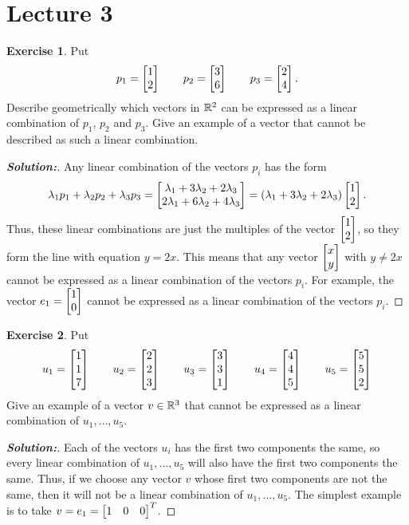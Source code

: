 \documentclass[a4paper]{amsart}
\theoremstyle{definition}
\newtheorem{exercise}{Exercise}
\newenvironment{solution}{\begin{proof}[\textbf{Solution:}] \vphantom{u}}{\end{proof}}
\begin{document}
\section{Lecture 3}

\begin{exercise}\label{ex-combination-i}
 Put 
 \[ p_1 = \left[\begin{matrix} 1 \\ 2 \end{matrix}\right] \qquad
    p_2 = \left[\begin{matrix} 3 \\ 6 \end{matrix}\right] \qquad
    p_3 = \left[\begin{matrix} 2 \\ 4 \end{matrix}\right].
 \]
 Describe geometrically which vectors in ${\mathbb{R}}^2$ can be expressed as a
 linear combination of $p_1$, $p_2$ and $p_3$.  Give an example of a
 vector that cannot be described as such a linear combination.
\end{exercise}
\begin{solution}
 Any linear combination of the vectors $p_i$ has the form 
 \[ \lambda_1p_1 + \lambda_2p_2 + \lambda_3p_3 =
     \left[\begin{matrix} \lambda_1+3\lambda_2+2\lambda_3 \\
          2\lambda_1+6\lambda_2+4\lambda_3 \end{matrix}\right] = 
     (\lambda_1+3\lambda_2+2\lambda_3)\left[\begin{matrix} 1 \\ 2 \end{matrix}\right].
 \]
 Thus, these linear combinations are just the multiples of the vector
 $\left[\begin{matrix} 1\\ 2\end{matrix}\right]$, so they form the line with equation $y=2x$.  This
 means that any vector $\left[\begin{matrix} x\\ y\end{matrix}\right]$ with $y\neq 2x$ cannot be
 expressed as a linear combination of the vectors $p_i$.  For example,
 the vector $e_1=\left[\begin{matrix} 1\\ 0\end{matrix}\right]$ cannot be expressed as a linear
 combination of the vectors $p_i$.
\end{solution}

\begin{exercise}\label{ex-combination-ii}
 Put 
 \[ u_1 = \left[\begin{matrix} 1 \\ 1 \\ 7 \end{matrix}\right] \qquad
    u_2 = \left[\begin{matrix} 2 \\ 2 \\ 3 \end{matrix}\right] \qquad
    u_3 = \left[\begin{matrix} 3 \\ 3 \\ 1 \end{matrix}\right] \qquad
    u_4 = \left[\begin{matrix} 4 \\ 4 \\ 5 \end{matrix}\right] \qquad
    u_5 = \left[\begin{matrix} 5 \\ 5 \\ 2 \end{matrix}\right] 
 \]
 Give an example of a vector $v\in{\mathbb{R}}^3$ that cannot be expressed as a
 linear combination of $u_1,\dotsc,u_5$.
\end{exercise}
\begin{solution}
 Each of the vectors $u_i$ has the first two components the same, so
 every linear combination of $u_1,\dotsc,u_5$ will also have the first
 two components the same.  Thus, if we choose any vector $v$ whose
 first two components are not the same, then it will not be a linear
 combination of $u_1,\dotsc,u_5$.  The simplest example is to take
 $v=e_1=\left[\begin{matrix} 1&0&0\end{matrix}\right]^T$.
\end{solution}
\end{document}
